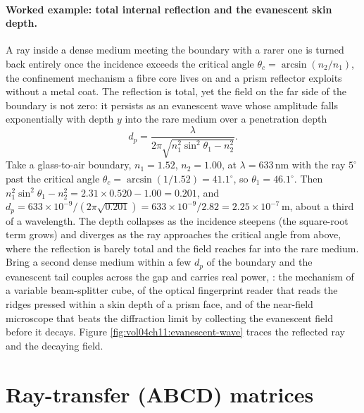 \paragraph{Worked example: total internal reflection and the evanescent skin
depth.} A ray inside a dense medium meeting the boundary with a rarer one is
turned back entirely once the incidence exceeds the critical angle
$\theta_c = \arcsin(n_2/n_1)$, the confinement mechanism a fibre core lives on
and a prism reflector exploits without a metal coat. The reflection is total, yet
the field on the far side of the boundary is not zero: it persists as an
evanescent wave whose amplitude falls exponentially with depth $y$ into the rare
medium over a penetration depth
\[
d_p = \frac{\lambda}{2\pi\sqrt{n_1^2\sin^2\theta_1 - n_2^2}} .
\]
Take a glass-to-air boundary, $n_1 = 1.52$, $n_2 = 1.00$, at
$\lambda = 633\,\si{\nano\meter}$ with the ray $5^{\circ}$ past the critical angle
$\theta_c = \arcsin(1/1.52) = 41.1^{\circ}$, so $\theta_1 = 46.1^{\circ}$. Then
$n_1^2\sin^2\theta_1 - n_2^2 = 2.31\times 0.520 - 1.00 = 0.201$, and
$d_p = 633\times 10^{-9}/(2\pi\sqrt{0.201}) = 633\times 10^{-9}/2.82 =
2.25\times 10^{-7}\,\si{\meter}$, about a third of a wavelength. The depth
collapses as the incidence steepens (the square-root term grows) and diverges as
the ray approaches the critical angle from above, where the reflection is barely
total and the field reaches far into the rare medium. Bring a second dense medium
within a few $d_p$ of the boundary and the evanescent tail couples across the gap
and carries real power, : the
mechanism of a variable beam-splitter cube, of the optical fingerprint reader that
reads the ridges pressed within a skin depth of a prism face, and of the
near-field microscope that beats the diffraction limit by collecting the
evanescent field before it decays. Figure \ref{fig:vol04ch11:evanescent-wave}
traces the reflected ray and the decaying field.



\section{Ray-transfer (ABCD) matrices}

